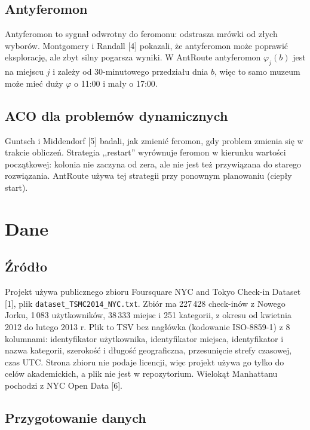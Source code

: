 \documentclass[11pt,a4paper]{article}
\begin{document}
\subsection{Antyferomon}

Antyferomon to sygnał odwrotny do feromonu: odstrasza mrówki od złych wyborów. Montgomery i Randall [4] pokazali, że antyferomon może poprawić eksplorację, ale zbyt silny pogarsza wyniki. W AntRoute antyferomon $\varphi_j(b)$ jest na miejscu $j$ i zależy od 30-minutowego przedziału dnia $b$, więc to samo muzeum może mieć duży $\varphi$ o 11:00 i mały o 17:00.

\subsection{ACO dla problemów dynamicznych}

Guntsch i Middendorf [5] badali, jak zmienić feromon, gdy problem zmienia się w trakcie obliczeń. Strategia ,,restart'' wyrównuje feromon w kierunku wartości początkowej: kolonia nie zaczyna od zera, ale nie jest też przywiązana do starego rozwiązania. AntRoute używa tej strategii przy ponownym planowaniu (ciepły start).

\section{Dane}

\subsection{Źródło}

Projekt używa publicznego zbioru Foursquare NYC and Tokyo Check-in Dataset [1], plik \texttt{dataset\_TSMC2014\_NYC.txt}. Zbiór ma 227\,428 check-inów z Nowego Jorku, 1\,083 użytkowników, 38\,333 miejsc i 251 kategorii, z okresu od kwietnia 2012 do lutego 2013 r. Plik to TSV bez nagłówka (kodowanie ISO-8859-1) z 8 kolumnami: identyfikator użytkownika, identyfikator miejsca, identyfikator i nazwa kategorii, szerokość i długość geograficzna, przesunięcie strefy czasowej, czas UTC. Strona zbioru nie podaje licencji, więc projekt używa go tylko do celów akademickich, a plik nie jest w repozytorium. Wielokąt Manhattanu pochodzi z NYC Open Data [6].

\subsection{Przygotowanie danych}
\end{document}
